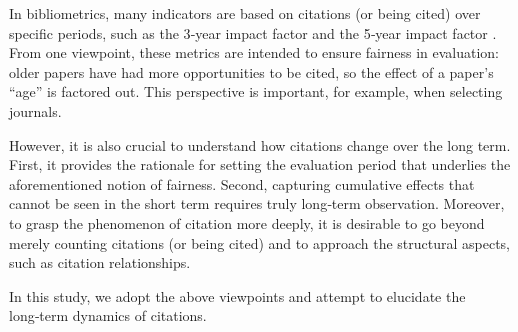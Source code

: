 In bibliometrics, many indicators are based on citations (or being cited) over specific periods, such as the 3‑year impact factor and the 5‑year impact factor \cite{Cla1}. From one viewpoint, these metrics are intended to ensure fairness in evaluation: older papers have had more opportunities to be cited, so the effect of a paper’s “age” is factored out. This perspective is important, for example, when selecting journals.  

However, it is also crucial to understand how citations change over the long term. First, it provides the rationale for setting the evaluation period that underlies the aforementioned notion of fairness. Second, capturing cumulative effects that cannot be seen in the short term requires truly long‑term observation. Moreover, to grasp the phenomenon of citation more deeply, it is desirable to go beyond merely counting citations (or being cited) and to approach the structural aspects, such as citation relationships.  

In this study, we adopt the above viewpoints and attempt to elucidate the long‑term dynamics of citations.
